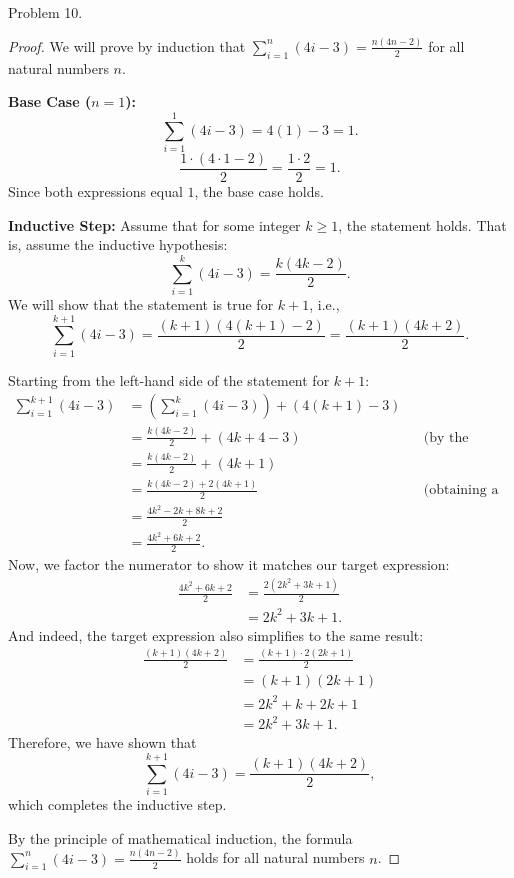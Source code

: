 \documentclass{article}
\begin{document}
Problem 10.
\begin{proof}
We will prove by induction that \(\sum_{i=1}^{n} (4i - 3) = \frac{n(4n - 2)}{2}\) for all natural numbers \(n\).

\textbf{Base Case (\(n = 1\)):}
\[
\sum_{i=1}^{1} (4i - 3) = 4(1) - 3 = 1.
\]
\[
\frac{1 \cdot (4 \cdot 1 - 2)}{2} = \frac{1 \cdot 2}{2} = 1.
\]
Since both expressions equal \(1\), the base case holds.

\textbf{Inductive Step:} Assume that for some integer \(k \geq 1\), the statement holds. That is, assume the inductive hypothesis:
\[
\sum_{i=1}^{k} (4i - 3) = \frac{k(4k - 2)}{2}.
\]
We will show that the statement is true for \(k+1\), i.e.,
\[
\sum_{i=1}^{k+1} (4i - 3) = \frac{(k+1)(4(k+1) - 2)}{2} = \frac{(k+1)(4k + 2)}{2}.
\]

Starting from the left-hand side of the statement for \(k+1\):
\begin{align*}
\sum_{i=1}^{k+1} (4i - 3) &= \left( \sum_{i=1}^{k} (4i - 3) \right) + (4(k+1) - 3) \\
&= \frac{k(4k - 2)}{2} + (4k + 4 - 3) && \text{(by the inductive hypothesis)} \\
&= \frac{k(4k - 2)}{2} + (4k + 1) \\
&= \frac{k(4k - 2) + 2(4k + 1)}{2} && \text{(obtaining a common denominator)} \\
&= \frac{4k^2 - 2k + 8k + 2}{2} \\
&= \frac{4k^2 + 6k + 2}{2}.
\end{align*}
Now, we factor the numerator to show it matches our target expression:
\begin{align*}
\frac{4k^2 + 6k + 2}{2} &= \frac{2(2k^2 + 3k + 1)}{2} \\
&= 2k^2 + 3k + 1.
\end{align*}
And indeed, the target expression also simplifies to the same result:
\begin{align*}
\frac{(k+1)(4k + 2)}{2} &= \frac{(k+1) \cdot 2(2k + 1)}{2} \\
&= (k+1)(2k + 1) \\
&= 2k^2 + k + 2k + 1 \\
&= 2k^2 + 3k + 1.
\end{align*}
Therefore, we have shown that
\[
\sum_{i=1}^{k+1} (4i - 3) = \frac{(k+1)(4k + 2)}{2},
\]
which completes the inductive step.

By the principle of mathematical induction, the formula \(\sum_{i=1}^{n} (4i - 3) = \frac{n(4n - 2)}{2}\) holds for all natural numbers \(n\).
\end{proof}
\end{document}
